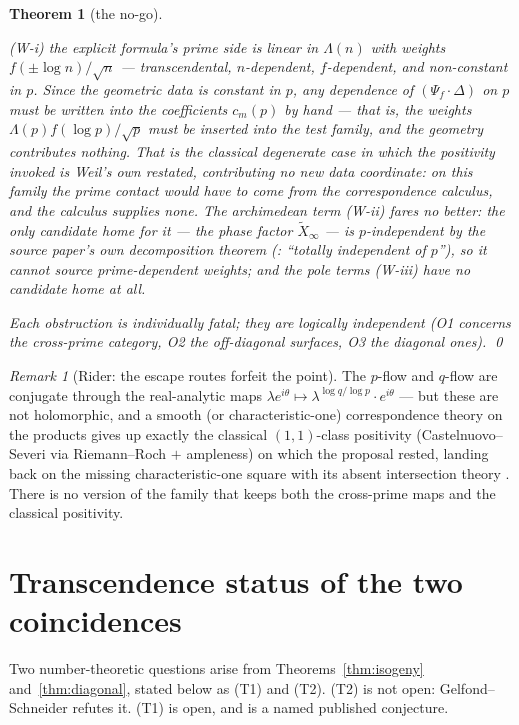 \documentclass[11pt]{article}
\newtheorem{theorem}{Theorem}
\theoremstyle{definition}
\theoremstyle{remark}
\newtheorem*{remarkunnum}{Remark}
\begin{document}
\begin{theorem}[the no-go]
\begin{itemize}
\textup{(W-i)} the explicit formula's prime side is linear in $\Lambda(n)$
with weights $f(\pm\log n)/\sqrt{n}$ --- transcendental, $n$-dependent,
$f$-dependent, and non-constant in $p$. Since the geometric data is constant
in $p$, \emph{any} dependence of $(\Psi_f\cdot\Delta)$ on $p$ must be
written into the coefficients $c_m(p)$ by hand --- that is, the weights
$\Lambda(p) f(\log p)/\sqrt{p}$ must be inserted into the test family, and
the geometry contributes nothing. That is the classical degenerate case in
which the positivity invoked is Weil's own restated, contributing no new
data coordinate: on this family the prime contact would have to come from
the correspondence calculus, and the calculus supplies none.
The archimedean term \textup{(W-ii)} fares no better: the only candidate
home for it --- the phase factor $\widetilde{X}_\infty$ --- is
$p$-independent \emph{by the source paper's own decomposition theorem}
(\cite[Thm.~5 and \S4.3]{CC26}: ``totally independent of $p$''), so it
cannot source prime-dependent weights; and the pole terms \textup{(W-iii)}
have no candidate home at all.
\end{itemize}
Each obstruction is individually fatal; they are logically independent
(\textup{O1} concerns the cross-prime category, \textup{O2} the off-diagonal
surfaces, \textup{O3} the diagonal ones). \qed
\end{theorem}

\begin{remarkunnum}[Rider: the escape routes forfeit the point]
The $p$-flow and $q$-flow are conjugate through the real-analytic maps
$\lambda e^{i\theta} \mapsto \lambda^{\log q/\log p}\cdot e^{i\theta}$ ---
but these are not holomorphic, and a smooth (or characteristic-one)
correspondence theory on the products gives up exactly the classical
$(1,1)$-class positivity (Castelnuovo--Severi via Riemann--Roch $+$
ampleness) on which the proposal rested, landing back on the missing
characteristic-one square with its absent intersection theory
\cite[\S4.3.2]{CE15}. There is no version of the family that keeps both the
cross-prime maps and the classical positivity.
\end{remarkunnum}

\section{Transcendence status of the two coincidences}
\label{sec:transcendence}

Two number-theoretic questions arise from Theorems~\ref{thm:isogeny}
and~\ref{thm:diagonal}, stated below as (T1) and (T2). (T2) is not open:
Gelfond--Schneider refutes it. (T1) is open, and is a named published
conjecture.
\end{document}
